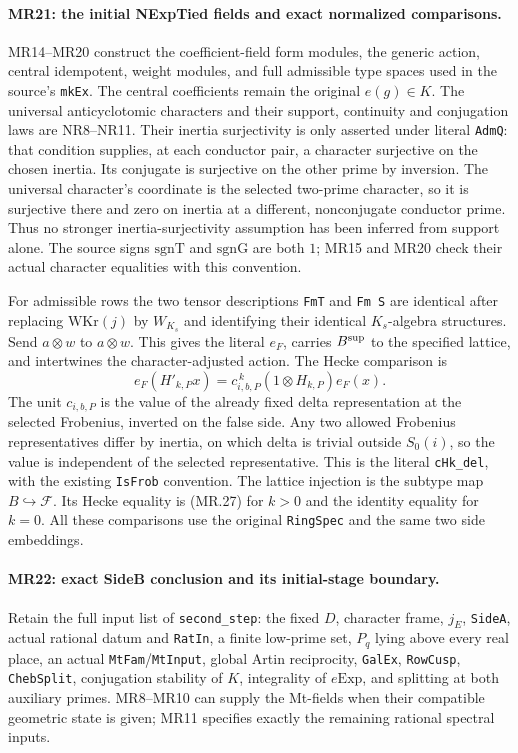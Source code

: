 \paragraph{MR21: the initial NExpTied fields and exact normalized comparisons.}
MR14--MR20 construct the coefficient-field form modules, the
generic action, central idempotent, weight modules, and full
admissible type spaces used in the source's \texttt{mkEx}.
The central coefficients remain the original $e(g)\in K$.
The universal anticyclotomic characters and their support,
continuity and conjugation laws are NR8--NR11. Their inertia
surjectivity is only asserted under literal \texttt{AdmQ}:
that condition supplies, at each conductor pair, a character
surjective on the chosen inertia. Its conjugate is surjective on
the other prime by inversion. The universal character's coordinate
is the selected two-prime character, so it is surjective there and
zero on inertia at a different, nonconjugate conductor prime.
Thus no stronger inertia-surjectivity assumption has been inferred
from support alone. The source signs $\mathrm{sgnT}$ and
$\mathrm{sgnG}$ are both $1$; MR15 and MR20 check their actual
character equalities with this convention.

For admissible rows the two tensor descriptions
\texttt{FmT} and \texttt{Fm S} are identical after replacing
$\mathrm{WKr}(j)$ by $W_{K_s}$ and identifying their identical
$K_s$-algebra structures. Send $a\otimes w$ to $a\otimes w$.
This gives the literal $e_F$, carries $B^{\rm sup}$ to the
specified lattice, and intertwines the character-adjusted action.
The Hecke comparison is
\[
 e_F(H'_{k,P}x)=c_{i,b,P}^{\,k}
                         (1\otimes H_{k,P})e_F(x).  \tag{MR.31}
\]
The unit $c_{i,b,P}$ is the value of the already fixed delta
representation at the selected Frobenius, inverted on the false
side. Any two allowed Frobenius representatives differ by inertia,
on which delta is trivial outside $S_0(i)$, so the value is
independent of the selected representative. This is the literal
\texttt{cHk\_del}, with the existing \texttt{IsFrob} convention.
The lattice injection is the subtype map $B\hookrightarrow
\mathcal F$. Its Hecke equality is (MR.27) for $k>0$ and the
identity equality for $k=0$. All these comparisons use the original
\texttt{RingSpec} and the same two side embeddings.

\paragraph{MR22: exact SideB conclusion and its initial-stage boundary.}
Retain the full input list of \texttt{second\_step}: the fixed
$D$, character frame, $j_E$, \texttt{SideA}, actual rational datum
and \texttt{RatIn}, a finite low-prime set, $P_q$ lying above every
real place, an actual \texttt{MtFam}/\texttt{MtInput}, global Artin
reciprocity, \texttt{GalEx}, \texttt{RowCusp}, \texttt{ChebSplit},
conjugation stability of $K$, integrality of $e\mathrm{Exp}$, and
splitting at both auxiliary primes. MR8--MR10 can supply the
Mt-fields when their compatible geometric state is given; MR11
specifies exactly the remaining rational spectral inputs.

